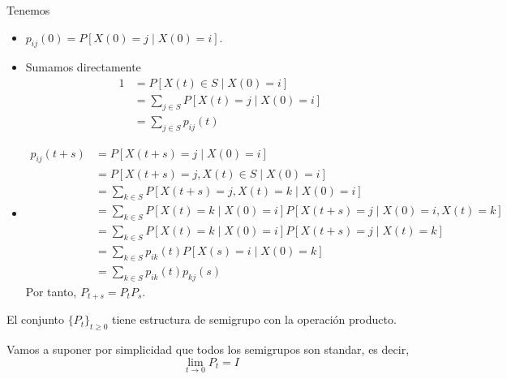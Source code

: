 \documentclass[PREyA.tex]{subfiles}
\begin{document}
\begin{dem} Tenemos
\begin{itemize}
\item $p_{ij}(0) = P[X(0)=j\mid X(0)=i]$.
\item Sumamos directamente
\begin{align*}
1 &= P[X(t)\in S \mid X(0)=i] \\
&= \sum_{j \in S} P[X(t)=j \mid X(0)=i]\\
&=\sum_{j\in S} p_{ij}(t)
\end{align*}
\item 
\begin{align*}
p_{ij}(t+s) &= P[X(t+s) =j \mid X(0)=i]\\
& = P[X(t+s)=j, X(t)\in S \mid X(0)=i]\\
&=\sum_{k \in S} P[X(t+s)=j, X(t)=k \mid X(0)=i]\\
&=\sum_{k\in S} P[X(t) = k  \mid X(0)=i] P[X(t+s) = j \mid X(0)=i, X(t)=k]\\
&=\sum_{k\in S} P[X(t) = k  \mid X(0)=i] P[X(t+s) = j \mid  X(t)=k]\\
&=\sum_{k\in S} p_{ik}(t) P[X(s) = i \mid  X(0)=k]\\
&=\sum_{k\in S} p_{ik}(t) p_{kj}(s) 
\end{align*}
Por tanto, $P_{t+s} = P_t P_s$.
\end{itemize}

\end{dem}
\begin{prop}
El conjunto $\{P_t\}_{t\geq 0}$ tiene estructura de semigrupo con la operación producto.
\end{prop}
\begin{nota}
Vamos a suponer por simplicidad que todos los semigrupos son standar, es decir, 
$$
\lim_{t\to0} P_t = I
$$
\end{nota}
\end{document}
